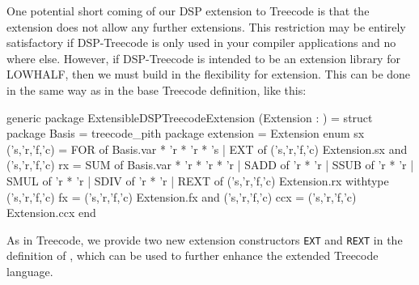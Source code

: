 One potential short coming of our DSP extension to Treecode is that
the extension does not allow any further extensions.  This restriction
may be entirely satisfactory if DSP-Treecode is only used in your compiler
applications and no where else.  However, if DSP-Treecode is intended
to be an extension library for LOWHALF, then  we must build in the flexibility
for extension.  This can be done in the same way as in the base Treecode
definition, like this: 
\begin{SML}
generic package ExtensibleDSPTreecodeExtension
  (Extension : ) =
struct
   package Basis = treecode_pith
   package extension = Extension
   enum sx ('s,'r,'f,'c) = 
      FOR of Basis.var * 'r * 'r * 's
    | EXT of ('s,'r,'f,'c) Extension.sx 
   and ('s,'r,'f,'c) rx = 
      SUM of Basis.var * 'r * 'r * 'r
    | SADD of 'r * 'r
    | SSUB of 'r * 'r
    | SMUL of 'r * 'r
    | SDIV of 'r * 'r
    | REXT of ('s,'r,'f,'c) Extension.rx
   withtype
        ('s,'r,'f,'c) fx   = ('s,'r,'f,'c) Extension.fx
   and  ('s,'r,'f,'c) ccx  = ('s,'r,'f,'c) Extension.ccx
end
\end{SML}

As in Treecode, we provide two new extension 
constructors \verb|EXT| and \verb|REXT| in
the definition of , which  can 
be used to further enhance the extended Treecode language.
